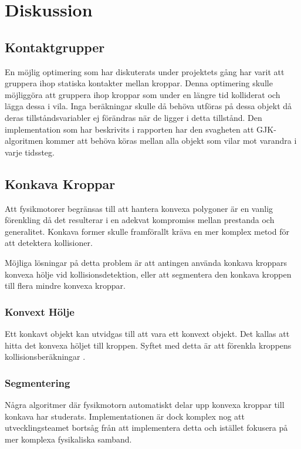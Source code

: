 \documentclass[a4paper,12pt,twopage,swedish]{article}
\begin{document}



\section{Diskussion}


\subsection{Kontaktgrupper}
En möjlig optimering som har diskuterats under projektets gång har varit att gruppera ihop statiska kontakter mellan kroppar. Denna optimering skulle möjliggöra att gruppera ihop kroppar som under en längre tid kolliderat och lägga dessa i vila. Inga beräkningar skulle då behöva utföras på dessa objekt då deras tillståndsvariabler ej förändras när de ligger i detta tillstånd. Den implementation som har beskrivits i rapporten har den svagheten att GJK-algoritmen kommer att behöva köras mellan alla objekt som vilar mot varandra i varje tidssteg.

\subsection{Konkava Kroppar}
Att fysikmotorer begränsas till att hantera konvexa polygoner är en vanlig förenkling då det resulterar i en adekvat kompromiss mellan prestanda och generalitet. Konkava former skulle framförallt kräva en mer komplex metod för att detektera kollisioner.

Möjliga lösningar på detta problem är att antingen använda konkava kroppars konvexa hölje vid kollisionsdetektion, eller att segmentera den konkava kroppen till flera mindre konvexa kroppar.

\subsubsection{Konvext Hölje}
Ett konkavt objekt kan utvidgas till att vara ett konvext objekt. Det kallas att hitta det konvexa höljet till kroppen. Syftet med detta är att förenkla kroppens kollisionsberäkningar \cite[s.~29]{avis97}.

\subsubsection{Segmentering}
Några algoritmer där fysikmotorn automatiskt delar upp konvexa kroppar till konkava har studerats.
Implementationen är dock komplex nog att utvecklingsteamet bortsåg från att implementera detta och istället fokusera på mer komplexa fysikaliska samband.
\end{document}
